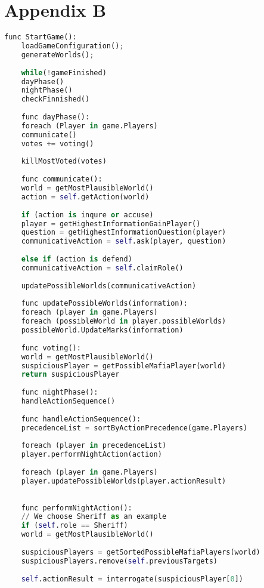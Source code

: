 \section{Appendix B}\label{app:B}
\begin{lstlisting}[language=Python, xleftmargin=0.5cm]
	func StartGame():
	loadGameConfiguration();
	generateWorlds();
	
	while(!gameFinished)
	dayPhase()
	nightPhase()
	checkFinnished()
	
	func dayPhase():
	foreach (Player in game.Players)
	communicate()
	votes += voting()
	
	killMostVoted(votes)
	
	func communicate():
	world = getMostPlausibleWorld()
	action = self.getAction(world)
	
	if (action is inqure or accuse)
	player = getHighestInformationGainPlayer()
	question = getHighestInformationQuestion(player)
	communicativeAction = self.ask(player, question)
	
	else if (action is defend)
	communicativeAction = self.claimRole()
	
	updatePossibleWorlds(communicativeAction)
	
	func updatePossibleWorlds(information):
	foreach (player in game.Players)
	foreach (possibleWorld in player.possibleWorlds)
	possibleWorld.UpdateMarks(information)
	
	func voting():
	world = getMostPlausibleWorld()
	suspiciousPlayer = getPossibleMafiaPlayer(world)
	return suspiciousPlayer
	
	func nightPhase():
	handleActionSequence()
	
	func handleActionSequence():
	precedenceList = sortByActionPrecedence(game.Players)
	
	foreach (player in precedenceList)
	player.performNightAction(action)
	
	foreach (player in game.Players)
	player.updatePossibleWorlds(player.actionResult)
	
	
	func performNightAction():
	// We choose Sheriff as an example
	if (self.role == Sheriff)
	world = getMostPlausibleWorld()
	
	suspiciousPlayers = getSortedPossibleMafiaPlayers(world)
	suspiciousPlayers.remove(self.previousTargets)
	
	self.actionResult = interrogate(suspiciousPlayer[0])
\end{lstlisting}
